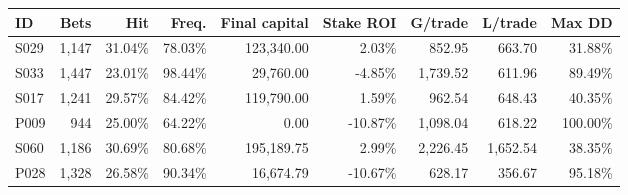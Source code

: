 \begin{tabularx}{\linewidth}{@{}Yrrrrrrrr@{}}
\toprule
ID & Bets & Hit & Freq. & Final capital & Stake ROI & G/trade & L/trade & Max DD \\

\midrule
S029 & 1,147 & 31.04\% & 78.03\% & 123,340.00 & 2.03\% & 852.95 & 663.70 & 31.88\% \\
S033 & 1,447 & 23.01\% & 98.44\% & 29,760.00 & -4.85\% & 1,739.52 & 611.96 & 89.49\% \\
S017 & 1,241 & 29.57\% & 84.42\% & 119,790.00 & 1.59\% & 962.54 & 648.43 & 40.35\% \\
P009 & 944 & 25.00\% & 64.22\% & 0.00 & -10.87\% & 1,098.04 & 618.22 & 100.00\% \\
S060 & 1,186 & 30.69\% & 80.68\% & 195,189.75 & 2.99\% & 2,226.45 & 1,652.54 & 38.35\% \\
P028 & 1,328 & 26.58\% & 90.34\% & 16,674.79 & -10.67\% & 628.17 & 356.67 & 95.18\% \\
\bottomrule
\end{tabularx}
